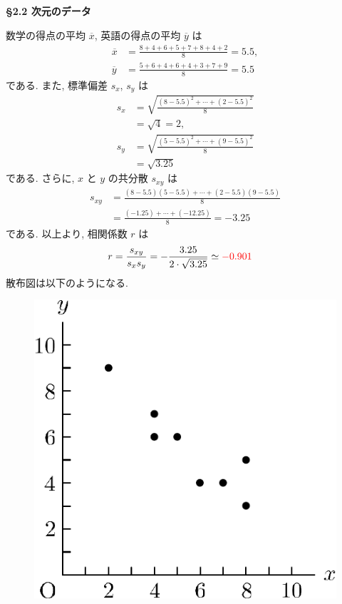 \vspace{\baselineskip}
{\textbf{\S 2.2  次元のデータ}}
\basic
\begin{qenumerate}
	\item{
		数学の得点の平均 $\overline{x}$, 英語の得点の平均 $\overline{y}$ は
		\begin{align}
			\overline{x} &= \frac{8 + 4 + 6 + 5 + 7 + 8 + 4 + 2}{8} = 5.5, \\
			\overline{y} &= \frac{5 + 6 + 4 + 6 + 4 + 3 + 7 + 9}{8} = 5.5
		\end{align}
		である.
		また, 標準偏差 $s_{x}$, $s_{y}$ は
		\begin{align}
			s_{x} &= \sqrt{\frac{(8 - 5.5)^{2} + \cdots + (2 - 5.5)^{2}}{8}} \\
				&= \sqrt{4} = 2, \\
			s_{y} &= \sqrt{\frac{(5 - 5.5)^{2} + \cdots + (9 - 5.5)^{2}}{8}} \\
				&= \sqrt{3.25}
		\end{align}
		である.
		さらに, $x$ と $y$ の共分散 $s_{xy}$ は
		\begin{align}
			s_{xy} &= \frac{(8 - 5.5)(5 - 5.5) + \cdots + (2 - 5.5)(9 - 5.5)}{8} \\
				&= \frac{(-1.25) + \cdots + (-12.25)}{8} = -3.25
		\end{align}
		である.
		以上より, 相関係数 $r$ は
		\begin{align}
			r &= \frac{s_{xy}}{s_{x}s_{y}} = -\frac{3.25}{2\cdot \sqrt{3.25}} \simeq \textcolor{red}{-0.901}
		\end{align}
		散布図は以下のようになる.
		\begin{figure}[H]
			\centering
			\includegraphics[scale = 0.5]{./figure/90.pdf}

\end{figure}}
\end{qenumerate}
